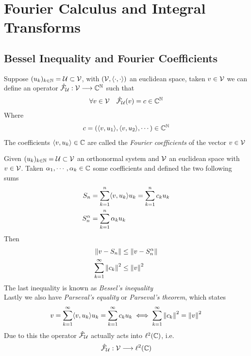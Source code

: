 \documentclass[../complete.tex]{subfiles}
\begin{document}
\chapter{Fourier Calculus and Integral Transforms}
\section{Bessel Inequality and Fourier Coefficients}
\begin{dfn}
	Suppose $(u_k)_{k\in\mathbb{N}}=\operatorname{\mathcal{U}}\subset\mathcal{V}$, with $(\mathcal{V},\operatorname{\langle\cdot,\cdot\rangle})$ an euclidean space, taken $v\in\mathcal{V}$ we can define an operator $\hat{\mathcal{F}}_{\operatorname{\mathcal{U}}}:\mathcal{V}\overset{}{\longrightarrow}\mathbb{C}^{\mathbb{N}}$ such that
	\begin{equation*}
		\forall v\in\mathcal{V}\quad\hat{\mathcal{F}}_{\operatorname{\mathcal{U}}}(v)=c\in\mathbb{C}^{\mathbb{N}}
	\end{equation*}
	Where
	\begin{equation*}
		c=(\langle v, u_1 \rangle,\langle v, u_2 \rangle,\cdots)\in\mathbb{C}^{\mathbb{N}}
	\end{equation*}
	The coefficients $\langle v, u_k \rangle\in\mathbb{C}$ are called the \textit{Fourier coefficients} of the vector $v\in\mathcal{V}$
\end{dfn}
\begin{thm}
	Given $(u_k)_{k\in\mathbb{N}}=\operatorname{\mathcal{U}}\subset\mathcal{V}$ an orthonormal system and $\mathcal{V}$ an euclidean space with $v\in\mathcal{V}$. Taken $\alpha_1,\cdots,\alpha_k\in\mathbb{C}$ some coefficients and defined the two following sums
	\begin{equation*}
		\begin{aligned}
			S_n&=\sum_{k=1}^{n}\langle v, u_k \rangle u_k=\sum_{k=1}^{n}c_ku_k\\
			S_n^\alpha&=\sum_{k=1}^{n}\alpha_ku_k
		\end{aligned}
	\end{equation*}
	Then
	\begin{equation*}
		\begin{aligned}
			\norm{v-S_n}&\le\norm{v-S_n^\alpha}\\
			\sum_{k=1}^{\infty}\norm{c_k}^2&\le\norm{v}^2\\
		\end{aligned}
	\end{equation*}
	The last inequality is known as \textit{Bessel's inequality}\\
	Lastly we also have \textit{Parseval's equality} or \textit{Parseval's theorem}, which states
	\begin{equation*}
		v=\sum_{k=1}^{\infty}\langle v, u_k \rangle u_k=\sum_{k=1}^{\infty}c_ku_k\iff\sum_{k=1}^{\infty}\norm{c_k}^2=\norm{v}^2
	\end{equation*}
	Due to this the operator $\hat{\mathcal{F}}_{\operatorname{\mathcal{U}}}$ actually acts into $\ell^2(\mathbb{C})$, i.e.
	\begin{equation*}
		\hat{\mathcal{F}}_{\operatorname{\mathcal{U}}}:\mathcal{V}\overset{}{\longrightarrow}\ell^2(\mathbb{C})
	\end{equation*}
\end{thm}
\end{document}
